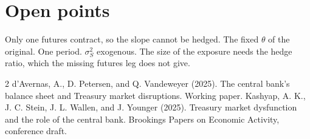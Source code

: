 \documentclass[12pt]{article}
\begin{document}
\section{Open points}

Only one futures contract, so the slope cannot be hedged. The fixed $\theta$ of the original. One period. $\sigma_S^2$ exogenous. The size of the exposure needs the hedge ratio, which the missing futures leg does not give.

\begin{thebibliography}{2}
d'Avernas, A., D. Petersen, and Q. Vandeweyer (2025).
\newblock The central bank's balance sheet and Treasury market disruptions.
\newblock Working paper.
Kashyap, A. K., J. C. Stein, J. L. Wallen, and J. Younger (2025).
\newblock Treasury market dysfunction and the role of the central bank.
\newblock Brookings Papers on Economic Activity, conference draft.
\end{thebibliography}
\end{document}
